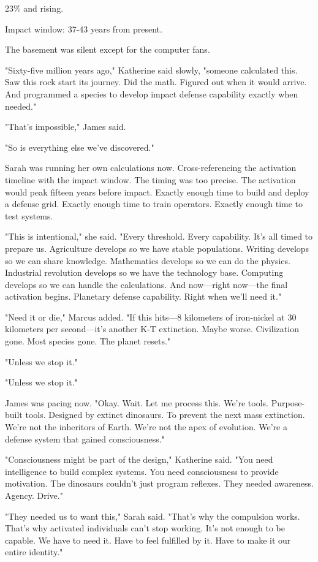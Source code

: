 23\% and rising.

Impact window: 37-43 years from present.

The basement was silent except for the computer fans.

"Sixty-five million years ago," Katherine said slowly, "someone calculated this. Saw this rock start its journey. Did the math. Figured out when it would arrive. And programmed a species to develop impact defense capability exactly when needed."

"That's impossible," James said.

"So is everything else we've discovered."

Sarah was running her own calculations now. Cross-referencing the activation timeline with the impact window. The timing was too precise. The activation would peak fifteen years before impact. Exactly enough time to build and deploy a defense grid. Exactly enough time to train operators. Exactly enough time to test systems.

"This is intentional," she said. "Every threshold. Every capability. It's all timed to prepare us. Agriculture develops so we have stable populations. Writing develops so we can share knowledge. Mathematics develops so we can do the physics. Industrial revolution develops so we have the technology base. Computing develops so we can handle the calculations. And now—right now—the final activation begins. Planetary defense capability. Right when we'll need it."

"Need it or die," Marcus added. "If this hits—8 kilometers of iron-nickel at 30 kilometers per second—it's another K-T extinction. Maybe worse. Civilization gone. Most species gone. The planet resets."

"Unless we stop it."

"Unless we stop it."

James was pacing now. "Okay. Wait. Let me process this. We're tools. Purpose-built tools. Designed by extinct dinosaurs. To prevent the next mass extinction. We're not the inheritors of Earth. We're not the apex of evolution. We're a defense system that gained consciousness."

"Consciousness might be part of the design," Katherine said. "You need intelligence to build complex systems. You need consciousness to provide motivation. The dinosaurs couldn't just program reflexes. They needed awareness. Agency. Drive."

"They needed us to want this," Sarah said. "That's why the compulsion works. That's why activated individuals can't stop working. It's not enough to be capable. We have to need it. Have to feel fulfilled by it. Have to make it our entire identity."

